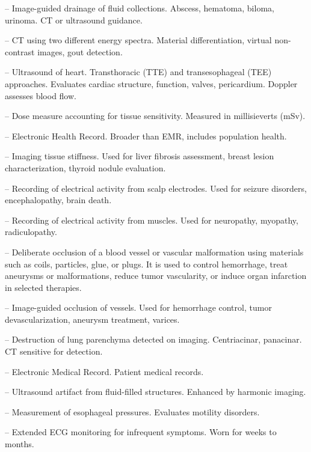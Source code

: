 -- Image-guided drainage of fluid collections. Abscess, hematoma, biloma, urinoma. CT or ultrasound guidance.


-- CT using two different energy spectra. Material differentiation, virtual non-contrast images, gout detection.

-- Ultrasound of heart. Transthoracic (TTE) and transesophageal (TEE) approaches. Evaluates cardiac structure, function, valves, pericardium. Doppler assesses blood flow.

-- Dose measure accounting for tissue sensitivity. Measured in millisieverts (mSv).

-- Electronic Health Record. Broader than EMR, includes population health.

-- Imaging tissue stiffness. Used for liver fibrosis assessment, breast lesion characterization, thyroid nodule evaluation.

-- Recording of electrical activity from scalp electrodes. Used for seizure disorders, encephalopathy, brain death.

-- Recording of electrical activity from muscles. Used for neuropathy, myopathy, radiculopathy.

-- Deliberate occlusion of a blood vessel or vascular malformation using materials such as coils, particles, glue, or plugs. It is used to control hemorrhage, treat aneurysms or malformations, reduce tumor vascularity, or induce organ infarction in selected therapies.

-- Image-guided occlusion of vessels. Used for hemorrhage control, tumor devascularization, aneurysm treatment, varices.

-- Destruction of lung parenchyma detected on imaging. Centriacinar, panacinar. CT sensitive for detection.

-- Electronic Medical Record. Patient medical records.

-- Ultrasound artifact from fluid-filled structures. Enhanced by harmonic imaging.

-- Measurement of esophageal pressures. Evaluates motility disorders.

-- Extended ECG monitoring for infrequent symptoms. Worn for weeks to months.

